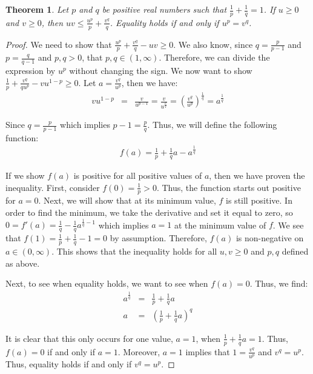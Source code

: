 \documentclass[psamsfonts]{amsart}
\newtheorem{thm}{Theorem}[section]
\theoremstyle{definition}
\theoremstyle{remark}
\numberwithin{equation}{section}
\begin{document}
\begin{thm}
Let $p$ and $q$ be positive real numbers such that $\frac{1}{p} + \frac{1}{q} = 1$. If $u \geq 0$ and $v \geq 0$, then $uv \leq \frac{u^p}{p} + \frac{v^q}{q}$. Equality holds if and only if $u^p = v^q$. 
\end{thm}

\begin{proof}
We need to show that $\frac{u^p}{p} + \frac{v^q}{q} - uv \geq 0$. We also know, since $q = \frac{p}{p-1}$ and $p = \frac{q}{q-1}$ and $p,q > 0$, that $p,q \in (1,\infty)$. Therefore, we can divide the expression by $u^p$ without changing the sign. We now want to show $\frac{1}{p} + \frac{v^q}{q u^p} - v u^{1-p} \geq 0$. Let $a = \frac{v^q}{u^p}$, then we have: 
\begin{eqnarray}
v u^{1-p} &=& \frac{v}{u^{p-1}} = \frac{v}{u^{\frac{p}{q}}} = \left( \frac{v^q}{u^p} \right)^{\frac{1}{q}} = a^{\frac{1}{q}}
\end{eqnarray}

Since $q = \frac{p}{p-1}$ which implies $p-1 = \frac{p}{q}$. Thus, we will define the following function:
\begin{eqnarray}
f(a) = \frac{1}{p} + \frac{1}{q} a - a^{\frac{1}{q}}
\end{eqnarray}

If we show $f(a)$ is positive for all positive values of $a$, then we have proven the inequality. First, consider $f(0) = \frac{1}{p} > 0$. Thus, the function starts out positive for $a=0$. Next, we will show that at its minimum value, $f$ is still positive. In order to find the minimum, we take the derivative and set it equal to zero, so $0 = f'(a) = \frac{1}{q} - \frac{1}{q} a^{\frac{1}{q} - 1}$ which implies $a = 1$ at the minimum value of $f$. We see that $f(1) = \frac{1}{p} + \frac{1}{q} - 1 = 0$ by assumption. Therefore, $f(a)$ is non-negative on $a \in (0,\infty)$. This shows that the inequality holds for all $u,v \geq 0$ and $p,q$ defined as above. 

Next, to see when equality holds, we want to see when $f(a) = 0$. Thus, we find:
\begin{eqnarray}
a^{\frac{1}{q}}&=& \frac{1}{p} + \frac{1}{q} a \\
a &=& \left( \frac{1}{p} + \frac{1}{q}a \right)^q
\end{eqnarray}

It is clear that this only occurs for one value, $a=1$, when $\frac{1}{p} + \frac{1}{q}a = 1$. Thus, $f(a) = 0$ if and only if $a =1$. Moreover, $a=1$ implies that $1 = \frac{v^q}{u^p}$ and $v^q = u^p$. Thus, equality holds if and only if $v^q = u^p$. 
\end{proof}
\end{document}

